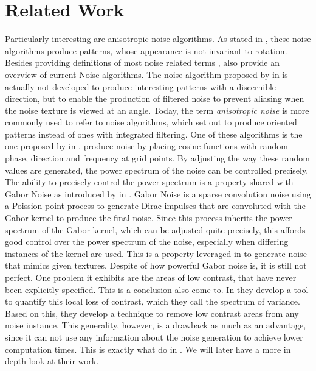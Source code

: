 \documentclass{utue} %
\begin{document}
\section{Related Work}
Particularly interesting are anisotropic noise algorithms. As stated in \cite{survey}, these noise algorithms produce patterns, whose appearance is not invariant to rotation. Besides providing definitions of most noise related terms \citeauthor{survey}, also provide an overview of current Noise algorithms. The noise algorithm proposed by \citeauthor{anisotropicNoise} in \cite{anisotropicNoise} is actually not developed to produce interesting patterns with a discernible direction, but to enable the production of filtered noise to prevent aliasing when the noise texture is viewed at an angle. Today, the term \textit{anisotropic noise} is more commonly used to refer to noise algorithms, which set out to produce oriented patterns instead of ones with integrated filtering. One of these algorithms is the one proposed by \citeauthor{randomPhaseNoise} in \cite{randomPhaseNoise}. \citeauthor{randomPhaseNoise} produce noise by placing cosine functions with random phase, direction and frequency at grid points. By adjusting the way these random values are generated, the power spectrum of the noise can be controlled precisely. The ability to precisely control the power spectrum is a property shared with Gabor Noise as introduced by \citeauthor{gaborNoise} in \cite{gaborNoise}. Gabor Noise is a sparse convolution noise using a Poission point process to generate Dirac impulses that are convoluted with the Gabor kernel to produce the final noise. Since this process inherits the power spectrum of the Gabor kernel, which can be adjusted quite precisely, this affords good control over the power spectrum of the noise, especially when differing instances of the kernel are used. This is a property leveraged in \cite{gaborNoiseByExample} to generate noise that mimics given textures. Despite of how powerful Gabor noise is, it is still not perfect. One problem it exhibits are the areas of low contrast, that have never been explicitly specified. This is a conclusion \citeauthor{spectrumOfVariance} also come to. In \cite{spectrumOfVariance} they develop a tool to quantify this local loss of contrast, which they call the spectrum of variance. Based on this, they develop a technique to remove low contrast areas from any noise instance. This generality, however, is a drawback as much as an advantage, since it can not use any information about the noise generation to achieve lower computation times. This is exactly what \citeauthor{phasorNoise} do in \cite{phasorNoise}. We will later have a more in depth look at their work.\\
\end{document}
